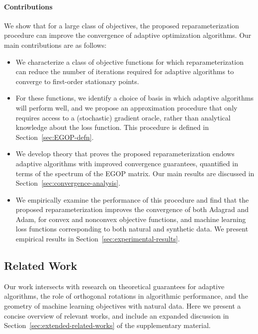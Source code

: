\documentclass{article}
\begin{document}
\paragraph{Contributions}
We show that for a large class of objectives, the proposed reparameterization procedure can improve the convergence of adaptive optimization algorithms. Our main contributions are as follows:

\begin{itemize}
    \item We characterize a class of objective functions for which reparameterization can reduce the number of iterations required for adaptive algorithms to converge to first-order stationary points. 
    \item For these functions, we identify a choice of basis in which adaptive algorithms will perform well, and we propose an approximation procedure that only requires access to a (stochastic) gradient oracle, rather than analytical knowledge about the loss function. This procedure is defined in Section~\ref{sec:EGOP-defn}.
    \item We develop theory that proves the proposed reparameterization endows adaptive algorithms with improved convergence guarantees, quantified in terms of the spectrum of the EGOP matrix. Our main results are discussed in Section~\ref{sec:convergence-analysis}.
    \item We empirically examine the performance of this procedure and find that the proposed reparameterization improves the convergence of both Adagrad and Adam, for convex and nonconvex objective functions,
    and machine learning loss functions corresponding to both natural and synthetic data. We present empirical results in Section~\ref{sec:experimental-results}.
\end{itemize}
\subsection{Related Work}\label{ssec:related-work}

Our work intersects with research on theoretical guarantees for adaptive algorithms, the role of orthogonal rotations in algorithmic performance, and the geometry of machine learning objectives with natural data. Here we present a concise overview of relevant works, and include an expanded discussion in Section~\ref{sec:extended-related-works} of the supplementary material. 
\end{document}
